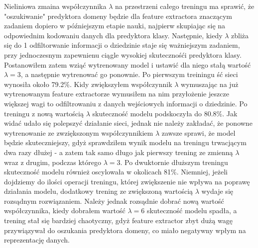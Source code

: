 \documentclass{article}
\begin{document}
Nieliniowa zmaina współczynnika $\lambda$ na przestrzeni całego treningu ma sprawić, że "oszukiwanie" predyktora domeny będzie dla feature extractora znaczącym zadaniem dopiero w późniejszym etapie nauki, najpierw skupiając się na odpowiednim kodowaniu danych dla predyktora klasy. Następnie, kiedy $\lambda$ zbliża się do 1 odfiltorwanie informacji o dziedzinie staje się ważniejszym zadaniem, przy jednoczesnym zapewnienu ciągle wysokiej skutecznośći predyktora klasy. Postanowiłem zatem wziąć wytrenowany model i ustawić dla niego stałą wartość $\lambda = 3$, a następnie wytrenować go ponownie. Po pierwszym treiningu ść sieci wynosiła około 79.2\%. Kidy zwiększyłem współczynnik $\lambda$ wymuszając na już wytrenowanym feature extractorze wymusiłem na nim przyłożenie jeszcze większej wagi to odfiltrowaniu z danych wejściowych informacji o dziedzinie. Po treningu z nową wartością $\lambda$ skuteczność modelu podskoczyła do 80.8\%. Jak widać udało się polepszyć działanie sieci, jednak nie należy zakładać, że ponowne wytrenowanie ze zwziększonym współczynnikiem $\lambda$ zawsze sprawi, że model będzie skuteczniejszy, gdyż sprawdziłem wynik modelu na treningu trwacjącym dwa razy dłużej - a zatem tak samo długo jak pierwszy trening ze zmienną $\lambda$ wraz z drugim, podczas którego $\lambda = 3$. Po dwuktornie dłuższym treningu skuteczność modelu również oscylowała w okolicach 81\%. Niemniej, jeżeli dojdziemy do ilości operacji treningu, której zwiększenie nie wpływa na poprawę działania modelu, dodatkowy trening ze zwiększoną wartością $\lambda$ wydaje się rozsądnym rozwiązaniem. Należy jednak rozsądnie dobrać nową wartość współczynnika, kiedy dobrałem wartość $\lambda = 6$ skuteczność modelu spadła, a trening stał się bardziej chaotyczny, gdyż feature extractor zbyt dużą wagę przywiązywał do oszukania predyktora domeny, co miało negatywny wpłym na reprezentację danych. 
\par
\end{document}
